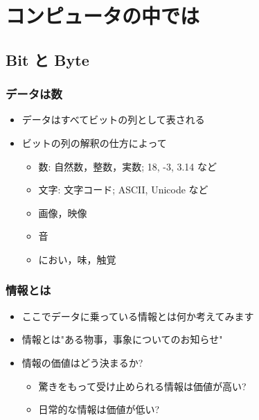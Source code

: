 \section{コンピュータの中では}
\subsection{Bit と Byte}
\begin{frame}
\frametitle{データは数}
  \begin{itemize}
\item データはすべてビットの列として表される
\item ビットの列の解釈の仕方によって
    \begin{itemize}
\item 数: 自然数，整数，実数; 18, -3, 3.14 など
\item 文字: 文字コード; ASCII, Unicode など
\item 画像，映像
\item 音
\item におい，味，触覚
    \end{itemize}
  \end{itemize}
\end{frame}
%
%
\begin{frame}
\frametitle{情報とは}
  \begin{itemize}
\item ここでデータに乗っている情報とは何か考えてみます
\item 情報とは"ある物事，事象についてのお知らせ"
\item 情報の価値はどう決まるか?
    \begin{itemize}
\item 驚きをもって受け止められる情報は価値が高い?
\item 日常的な情報は価値が低い?
    \end{itemize}
  \end{itemize}
\end{frame}
